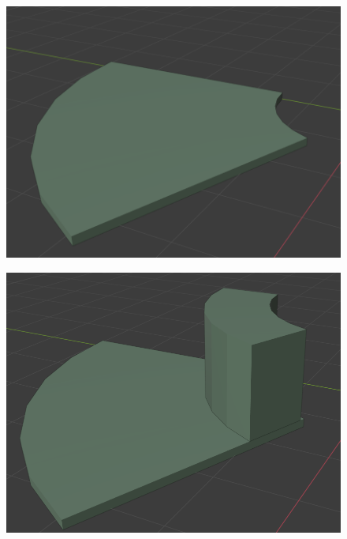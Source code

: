 \begin{figure}
\centering
\begin{minipage}{.3\textwidth}
  \centering
  \includegraphics[width=.9\linewidth]{04.Desarrollo/03.Entrega3/02.Iteracion3_2/00.Figuras/04.ascensor_3.png}
  \label{fig:E3_ascensorVacio}
\end{minipage}%
\begin{minipage}{.3\textwidth}
  \centering
  \includegraphics[width=.87\linewidth]{04.Desarrollo/03.Entrega3/02.Iteracion3_2/00.Figuras/05.ascensor_2.png}
  \label{fig:E3_ascensorMesa}
\end{minipage}
\begin{minipage}{.3\textwidth}
  \centering

\end{minipage}
\end{figure}
